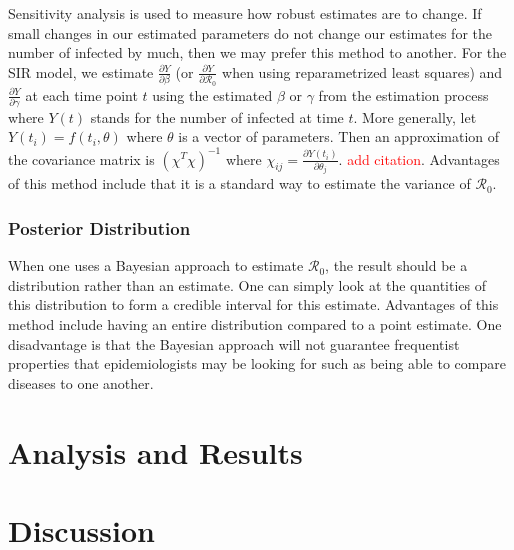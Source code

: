 \documentclass[12pt]{article}
\newcommand{\com}[1]{\textcolor{red}{ #1}}
\newcommand{\rr}{\ensuremath{\mathcal{R}_0}}
\begin{document}
Sensitivity analysis is used to measure how robust estimates are to change.  If small changes in our estimated parameters do not change our estimates for the number of infected by much, then we may prefer this method to another.  For the SIR model, we estimate \(\frac{\partial Y}{\partial \beta}\) (or \(\frac{\partial Y}{\partial \rr}\) when using reparametrized least squares) and \(\frac{\partial Y}{\partial \gamma}\) at each time point \(t\) using the estimated \(\beta\) or \(\gamma\) from the estimation process where $Y(t)$ stands for the number of infected at time $t$.  More generally,  let $Y(t_i) = f(t_i, \theta)$ where $\theta$ is a vector of parameters. Then an approximation of the covariance matrix is \((\chi^T \chi)^{-1}\) where \(\chi_{ij} = \frac{ \partial Y(t_i)}{ \partial \theta_j}\). \com{add citation}.  Advantages of this method include that it is a standard way to estimate the variance of $\rr$.

\subsubsection{Posterior Distribution}
When one uses a Bayesian approach to estimate $\rr$, the result should be a distribution rather than an estimate.  One can simply look at the quantities of this distribution to form a credible interval for this estimate.  Advantages of this method include having an entire distribution compared to a point estimate.  One disadvantage is that the Bayesian approach will not guarantee frequentist properties that epidemiologists may be looking for such as being able to compare diseases to one another.







\section{Analysis and Results}
\label{sec:results}

\section{Discussion}
\label{sec:dis}


\label{sec:details}







\appendix
\end{document}
